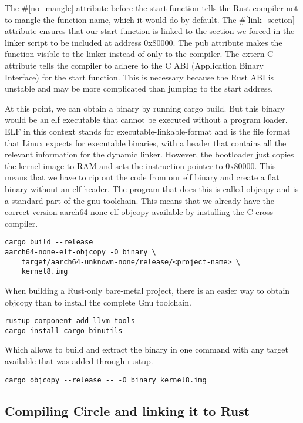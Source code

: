 The \#[no\_mangle] attribute before the start function tells the Rust compiler not to mangle the function name, which it would do by default.
The \#[link\_section] attribute ensures that our start function is linked to the section we forced in the linker script to be included at address 0x80000.
The pub attribute makes the function visible to the linker instead of only to the compiler.
The extern C attribute tells the compiler to adhere to the C ABI (Application Binary Interface) for the start function.
This is necessary because the Rust ABI is unstable and may be more complicated than jumping to the start address.

At this point, we can obtain a binary by running cargo build.
But this binary would be an elf executable that cannot be executed without a program loader.
ELF in this context stands for executable-linkable-format and is the file format that Linux expects for executable binaries,
with a header that contains all the relevant information for the dynamic linker.
However, the bootloader just copies the kernel image to RAM and sets the instruction pointer to 0x80000.
This means that we have to rip out the code from our elf binary and create a flat binary without an elf header.
The program that does this is called objcopy and is a standard part of the gnu toolchain.
This means that we already have the correct version aarch64-none-elf-objcopy available by installing the C cross-compiler.

\begin{verbatim}
cargo build --release
aarch64-none-elf-objcopy -O binary \
    target/aarch64-unknown-none/release/<project-name> \
    kernel8.img
\end{verbatim}

When building a Rust-only bare-metal project, there is an easier way to obtain objcopy than to install the complete Gnu toolchain.
\begin{verbatim}
rustup component add llvm-tools
cargo install cargo-binutils
\end{verbatim}
Which allows to build and extract the binary in one command with any target available that was added through rustup.
\begin{verbatim}
cargo objcopy --release -- -O binary kernel8.img
\end{verbatim}

\subsection{Compiling Circle and linking it to Rust}
\label{sec:concept_and_implementation:bare-metal:ffi}

